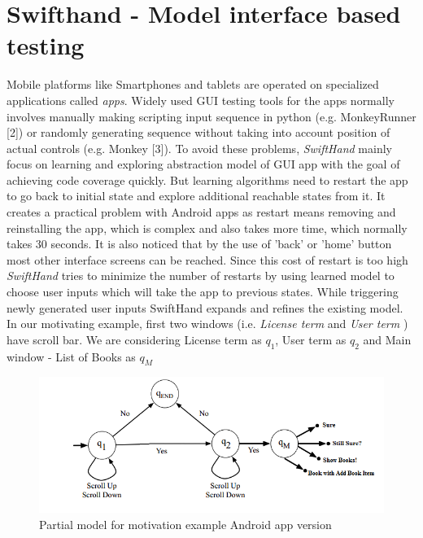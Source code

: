 \documentclass[authoryear,preprint, twocolumn]{sigplanconf}
\begin{document}
\section{Swifthand - Model interface based testing}
\label{sec:swifthand}

Mobile platforms like Smartphones and tablets are operated on specialized applications called \emph{apps}. Widely used GUI testing tools for the apps normally involves manually making scripting input sequence in python (e.g. MonkeyRunner [2]) or randomly generating sequence without taking into account position of actual controls (e.g. Monkey [3]). To avoid these problems, \emph{SwiftHand} mainly focus on learning and exploring abstraction model of GUI app with the goal of achieving code coverage quickly. But learning algorithms need to restart the app to go back to initial state and explore additional reachable states from it. It creates a practical problem with Android apps as restart means removing and reinstalling the app, which is complex and also takes more time, which normally takes 30 seconds. It is also noticed that by the use of 'back' or 'home' button most other interface screens can be reached. 
\newline Since this cost of restart is too high \emph{SwiftHand} tries to minimize the number of restarts by using learned model to choose user inputs which will take the app to previous states. While triggering newly generated user inputs SwiftHand expands and refines the existing model.
\newline In our motivating example, first two windows (i.e. \emph{License term} and \emph{User term} ) have scroll bar. We are considering License term as \emph{$q_1$}, User term as \emph{$q_2$} and Main window - List of Books as \emph{$q_M$}

\begin{figure}[ht]
	\centering
	\includegraphics[width=1.0\linewidth]{figures/swifthand1}
	\caption[Partial model for motivation example Android app version]{\label{f:partialmodelandroid}Partial model for motivation example Android app version}
\end{figure}
\end{document}
